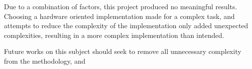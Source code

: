 Due to a combination of factors, this project produced no meaningful results. Choosing a hardware oriented implementation made for a complex task, and attempts to reduce the complexity of the implementation only added unexpected complexities, resulting in a more complex implementation than intended. 

Future works on this subject should seek to remove all unnecessary complexity from the methodology, and 